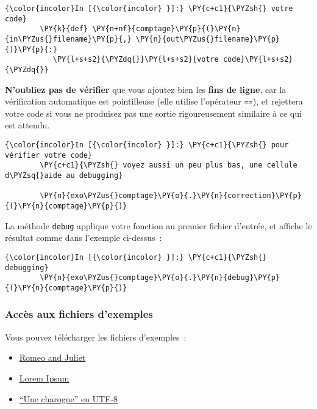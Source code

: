     \begin{Verbatim}[commandchars=\\\{\}]
{\color{incolor}In [{\color{incolor} }]:} \PY{c+c1}{\PYZsh{} votre code}
        \PY{k}{def} \PY{n+nf}{comptage}\PY{p}{(}\PY{n}{in\PYZus{}filename}\PY{p}{,} \PY{n}{out\PYZus{}filename}\PY{p}{)}\PY{p}{:}
           \PY{l+s+s2}{\PYZdq{}}\PY{l+s+s2}{votre code}\PY{l+s+s2}{\PYZdq{}}
\end{Verbatim}


    \textbf{N'oubliez pas de vérifier} que vous ajoutez bien les
\textbf{fins de ligne}, car la vérification automatique est pointilleuse
(elle utilise l'opérateur \texttt{==}), et rejettera votre code si vous
ne produisez pas une sortie rigoureusement similaire à ce qui est
attendu.

    \begin{Verbatim}[commandchars=\\\{\}]
{\color{incolor}In [{\color{incolor} }]:} \PY{c+c1}{\PYZsh{} pour vérifier votre code}
        \PY{c+c1}{\PYZsh{} voyez aussi un peu plus bas, une cellule d\PYZsq{}aide au debugging}
        
        \PY{n}{exo\PYZus{}comptage}\PY{o}{.}\PY{n}{correction}\PY{p}{(}\PY{n}{comptage}\PY{p}{)}
\end{Verbatim}


    La méthode \texttt{debug} applique votre fonction au premier fichier
d'entrée, et affiche le résultat comme dans l'exemple ci-dessus~:

    \begin{Verbatim}[commandchars=\\\{\}]
{\color{incolor}In [{\color{incolor} }]:} \PY{c+c1}{\PYZsh{} debugging}
        \PY{n}{exo\PYZus{}comptage}\PY{o}{.}\PY{n}{debug}\PY{p}{(}\PY{n}{comptage}\PY{p}{)}
\end{Verbatim}


    \hypertarget{accuxe8s-aux-fichiers-dexemples}{%
\subsubsection{Accès aux fichiers
d'exemples}\label{accuxe8s-aux-fichiers-dexemples}}

    Vous pouvez télécharger les fichiers d'exemples~:
    
\begin{itemize}
	\item
	\href{data/romeo_and_juliet.txt}{Romeo and Juliet}
	\item
	\href{data/lorem_ipsum.txt}{Lorem Ipsum}
	\item
	\href{data/une_charogne_unicode.txt}{``Une charogne'' en UTF-8}
\end{itemize}


